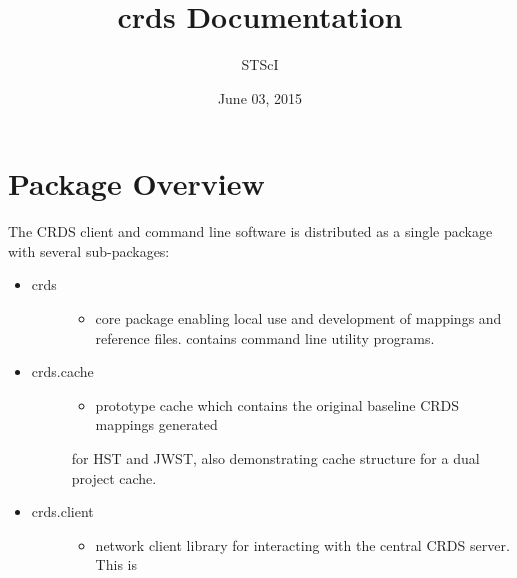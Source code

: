 \documentclass[letterpaper,10pt,english]{sphinxmanual}
\title{crds Documentation}
\date{June 03, 2015}
\author{STScI}
\begin{document}
\maketitle
\tableofcontents
{}\label{index::doc}



\chapter{Package Overview}
\label{installation:package-overview}\label{installation:crds-user-manual}\label{installation::doc}
The CRDS client and command line software is distributed as a single package with
several sub-packages:
\begin{itemize}
\item {} \begin{description}
\item[{crds}] \leavevmode\begin{itemize}
\item {} 
core package enabling local use and development of mappings
and reference files.  contains command line utility programs.

\end{itemize}

\end{description}

\item {} \begin{description}
\item[{crds.cache}] \leavevmode\begin{itemize}
\item {} 
prototype cache which contains the original baseline CRDS mappings generated

\end{itemize}

for HST and JWST,  also demonstrating cache structure for a dual project cache.

\end{description}

\item {} \begin{description}
\item[{crds.client}] \leavevmode\begin{itemize}
\item {} 
network client library for interacting with the central CRDS server.  This is

\end{itemize}


\end{description}
\end{itemize}
\end{document}
